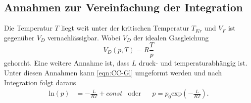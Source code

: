 
\subsection{Annahmen zur Vereinfachung der Integration} %
\label{sub:Vereinfachung}
Die Temperatur $T$ liegt weit unter der kritischen Temperatur $T_{Kr}$ und $V_F$ ist gegenüber $V_D$ vernachlässigbar.
Wobei $V_D$ der idealen Gasgleichung
\begin{equation}
    V_D(p,T) = R\frac{T}{p}\label{eqn:idGas}
\end{equation}
gehorcht.
Eine weitere Annahme ist, dass $L$ druck- und temperaturabhängig ist. 
Unter diesen Annahmen kann \autoref{eqn:CC-Gl} umgeformt werden und nach Integration folgt daraus
\begin{align}
    \text{ln}(p) &= -\frac{L}{RT}+const &\text{oder} && p=p_0 \text{exp}(-\frac{L}{RT}).
    \label{eqn:CC-Gl_2}
\end{align}
 